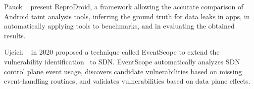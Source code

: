 Pauck \etal~\cite{10.1145/3236024.3236029} present ReproDroid, a framework
allowing the accurate comparison of Android taint analysis tools, inferring the
ground truth for data leaks in apps, in automatically applying tools to
benchmarks, and in evaluating the obtained results.

Ujcich \etal~\cite{Ujcich+etal:2020:EventScope} in 2020 proposed a technique
called EventScope to extend the vulnerability identification~\cite{6994333} to
SDN. EventScope automatically analyzes SDN control plane event usage, discovers
candidate vulnerabilities based on missing event-handling routines, and
validates vulnerabilities based on data plane effects.

